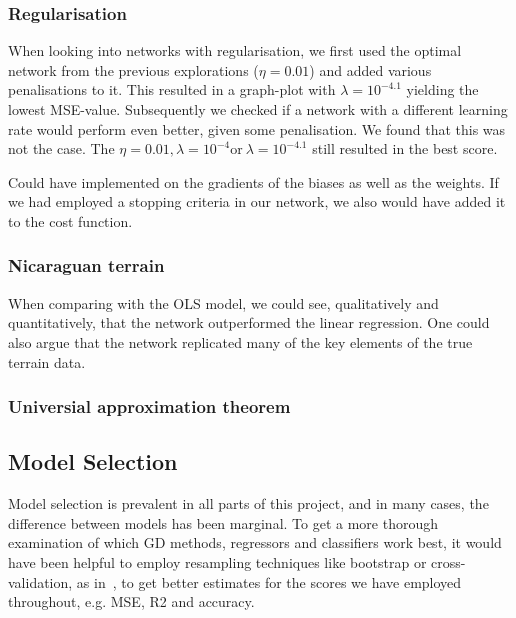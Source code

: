 
        \subsubsection{Regularisation}
            When looking into networks with regularisation, we first used the optimal network from the previous explorations ($\eta = 0.01$) and added various penalisations to it. This resulted in a graph-plot with $\lambda= 10^{-4.1}$ yielding the lowest MSE-value. Subsequently we checked if a network with a different learning rate would perform even better, given some penalisation. We found that this was not the case. The $\eta = 0.01, \lambda = 10^{-4} \text{or} \ \lambda = 10^{-4.1}$ still resulted in the best score. 

            Could have implemented on the gradients of the biases as well as the weights.  If we had employed a stopping criteria in our network, we also would have added it to the cost function. 

        \subsubsection{Nicaraguan terrain}
            When comparing with the OLS model, we could see, qualitatively and quantitatively, that the network outperformed the linear regression. One could also argue that the network replicated many of the key elements of the true terrain data.  
            
        \subsubsection{Universial approximation theorem}

\subsection{Model Selection}
    Model selection is prevalent in all parts of this project, and in many cases, the difference between models has been marginal. To get a more thorough examination of which GD methods, regressors and classifiers work best, it would have been helpful to employ resampling techniques like bootstrap or cross-validation, as in~\citep{Project1}, to get better estimates for the scores we have employed throughout, e.g. MSE, R2 and accuracy.